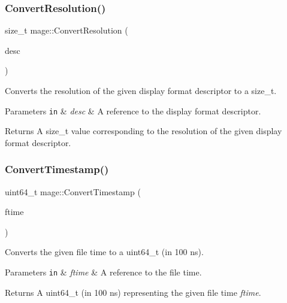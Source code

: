 \subsubsection{\texorpdfstring{Convert\+Resolution()}{ConvertResolution()}}
{\footnotesize\ttfamily size\+\_\+t mage\+::\+Convert\+Resolution (\begin{DoxyParamCaption}\item[{const D\+X\+G\+I\+\_\+\+M\+O\+D\+E\+\_\+\+D\+E\+S\+C1 \&}]{desc }\end{DoxyParamCaption})\hspace{0.3cm}{\ttfamily [noexcept]}}

Converts the resolution of the given display format descriptor to a {\ttfamily size\+\_\+t}.


\begin{DoxyParams}[1]{Parameters}
\mbox{\tt in}  & {\em desc} & A reference to the display format descriptor. \\
\hline
\end{DoxyParams}
\begin{DoxyReturn}{Returns}
A {\ttfamily size\+\_\+t} value corresponding to the resolution of the given display format descriptor. 
\end{DoxyReturn}
\hypertarget{namespacemage_ad23a1e04334d7026888e9d47fc8ffd7e}{}\label{namespacemage_ad23a1e04334d7026888e9d47fc8ffd7e} 
\subsubsection{\texorpdfstring{Convert\+Timestamp()}{ConvertTimestamp()}}
{\footnotesize\ttfamily uint64\+\_\+t mage\+::\+Convert\+Timestamp (\begin{DoxyParamCaption}\item[{const F\+I\+L\+E\+T\+I\+ME \&}]{ftime }\end{DoxyParamCaption})\hspace{0.3cm}{\ttfamily [noexcept]}}

Converts the given file time to a {\ttfamily uint64\+\_\+t} (in 100 ns).


\begin{DoxyParams}[1]{Parameters}
\mbox{\tt in}  & {\em ftime} & A reference to the file time. \\
\hline
\end{DoxyParams}
\begin{DoxyReturn}{Returns}
A {\ttfamily uint64\+\_\+t} (in 100 ns) representing the given file time {\itshape ftime}. 
\end{DoxyReturn}
\hypertarget{namespacemage_aaeeefa254fef15c66cc60bacd5a38c95}{}\label{namespacemage_aaeeefa254fef15c66cc60bacd5a38c95} 
